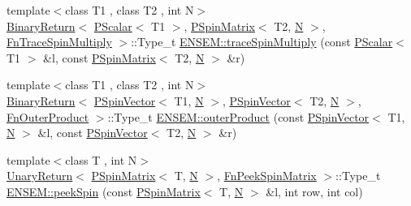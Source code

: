 \begin{DoxyCompactItemize}
\item 
{\footnotesize template$<$class T1 , class T2 , int N$>$ }\\\mbox{\hyperlink{structENSEM_1_1BinaryReturn}{Binary\+Return}}$<$ \mbox{\hyperlink{classENSEM_1_1PScalar}{P\+Scalar}}$<$ T1 $>$, \mbox{\hyperlink{classENSEM_1_1PSpinMatrix}{P\+Spin\+Matrix}}$<$ T2, \mbox{\hyperlink{operator__name__util_8cc_a7722c8ecbb62d99aee7ce68b1752f337}{N}} $>$, \mbox{\hyperlink{structENSEM_1_1FnTraceSpinMultiply}{Fn\+Trace\+Spin\+Multiply}} $>$\+::Type\+\_\+t \mbox{\hyperlink{group__primspinmatrix_ga2dc2ab87ff63abab3c74a0a1f1dd3d09}{E\+N\+S\+E\+M\+::trace\+Spin\+Multiply}} (const \mbox{\hyperlink{classENSEM_1_1PScalar}{P\+Scalar}}$<$ T1 $>$ \&l, const \mbox{\hyperlink{classENSEM_1_1PSpinMatrix}{P\+Spin\+Matrix}}$<$ T2, \mbox{\hyperlink{operator__name__util_8cc_a7722c8ecbb62d99aee7ce68b1752f337}{N}} $>$ \&r)
\item 
{\footnotesize template$<$class T1 , class T2 , int N$>$ }\\\mbox{\hyperlink{structENSEM_1_1BinaryReturn}{Binary\+Return}}$<$ \mbox{\hyperlink{classENSEM_1_1PSpinVector}{P\+Spin\+Vector}}$<$ T1, \mbox{\hyperlink{operator__name__util_8cc_a7722c8ecbb62d99aee7ce68b1752f337}{N}} $>$, \mbox{\hyperlink{classENSEM_1_1PSpinVector}{P\+Spin\+Vector}}$<$ T2, \mbox{\hyperlink{operator__name__util_8cc_a7722c8ecbb62d99aee7ce68b1752f337}{N}} $>$, \mbox{\hyperlink{structENSEM_1_1FnOuterProduct}{Fn\+Outer\+Product}} $>$\+::Type\+\_\+t \mbox{\hyperlink{group__primspinmatrix_ga6ff39d20fc8369664c9b3849e00d654d}{E\+N\+S\+E\+M\+::outer\+Product}} (const \mbox{\hyperlink{classENSEM_1_1PSpinVector}{P\+Spin\+Vector}}$<$ T1, \mbox{\hyperlink{operator__name__util_8cc_a7722c8ecbb62d99aee7ce68b1752f337}{N}} $>$ \&l, const \mbox{\hyperlink{classENSEM_1_1PSpinVector}{P\+Spin\+Vector}}$<$ T2, \mbox{\hyperlink{operator__name__util_8cc_a7722c8ecbb62d99aee7ce68b1752f337}{N}} $>$ \&r)
\item 
{\footnotesize template$<$class T , int N$>$ }\\\mbox{\hyperlink{structENSEM_1_1UnaryReturn}{Unary\+Return}}$<$ \mbox{\hyperlink{classENSEM_1_1PSpinMatrix}{P\+Spin\+Matrix}}$<$ T, \mbox{\hyperlink{operator__name__util_8cc_a7722c8ecbb62d99aee7ce68b1752f337}{N}} $>$, \mbox{\hyperlink{structENSEM_1_1FnPeekSpinMatrix}{Fn\+Peek\+Spin\+Matrix}} $>$\+::Type\+\_\+t \mbox{\hyperlink{group__primspinmatrix_ga2af6db806ff17a39ca84960a216d33c7}{E\+N\+S\+E\+M\+::peek\+Spin}} (const \mbox{\hyperlink{classENSEM_1_1PSpinMatrix}{P\+Spin\+Matrix}}$<$ T, \mbox{\hyperlink{operator__name__util_8cc_a7722c8ecbb62d99aee7ce68b1752f337}{N}} $>$ \&l, int row, int col)

\end{DoxyCompactItemize}
